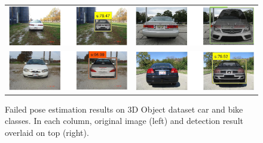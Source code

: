 \documentclass[10pt,twocolumn,letterpaper]{article}
\begin{document}
\begin{figure}[h]
\setlength\tabcolsep{1pt}
\centering
\begin{tabular}{|c|c|}
  \hline
  \includegraphics[width=0.40\linewidth]{supp/car13.png} &
  \includegraphics[width=0.40\linewidth]{supp/car30.png} \\ 
  \includegraphics[width=0.40\linewidth]{supp/car18.png} &
  \includegraphics[width=0.40\linewidth]{supp/car25.png} \\
  \hline
  \end{tabular}
\caption{Failed pose estimation results on 3D Object dataset car and bike
classes. In each column, original image (left) and detection result overlaid on
top (right).}%
  \label{fig:3dobject_car_bad}
\end{figure}
\end{document}
